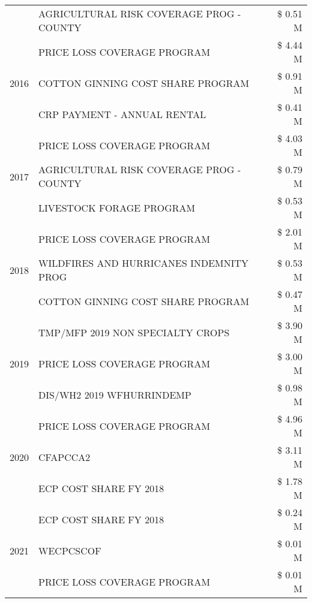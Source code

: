\begin{tabular}{llr}
 & AGRICULTURAL RISK COVERAGE PROG - COUNTY & \$ 0.51 M \\
\cline{1-3}
\multirow[t]{3}{*}{2016} & PRICE LOSS COVERAGE PROGRAM                   & \$ 4.44 M \\
 & COTTON GINNING COST SHARE PROGRAM             & \$ 0.91 M \\
 & CRP PAYMENT - ANNUAL RENTAL                   & \$ 0.41 M \\
\cline{1-3}
\multirow[t]{3}{*}{2017} & PRICE LOSS COVERAGE PROGRAM & \$ 4.03 M \\
 & AGRICULTURAL RISK COVERAGE PROG - COUNTY & \$ 0.79 M \\
 & LIVESTOCK FORAGE PROGRAM & \$ 0.53 M \\
\cline{1-3}
\multirow[t]{3}{*}{2018} & PRICE LOSS COVERAGE PROGRAM & \$ 2.01 M \\
 & WILDFIRES AND HURRICANES INDEMNITY PROG & \$ 0.53 M \\
 & COTTON GINNING COST SHARE PROGRAM & \$ 0.47 M \\
\cline{1-3}
\multirow[t]{3}{*}{2019} & TMP/MFP 2019 NON SPECIALTY CROPS & \$ 3.90 M \\
 & PRICE LOSS COVERAGE PROGRAM & \$ 3.00 M \\
 & DIS/WH2 2019 WFHURRINDEMP & \$ 0.98 M \\
\cline{1-3}
\multirow[t]{3}{*}{2020} & PRICE LOSS COVERAGE PROGRAM & \$ 4.96 M \\
 & CFAPCCA2 & \$ 3.11 M \\
 & ECP COST SHARE FY 2018 & \$ 1.78 M \\
\cline{1-3}
\multirow[t]{3}{*}{2021} & ECP COST SHARE FY 2018 & \$ 0.24 M \\
 & WECPCSCOF & \$ 0.01 M \\
 & PRICE LOSS COVERAGE PROGRAM & \$ 0.01 M \\
\cline{1-3}
\bottomrule
\end{tabular}
